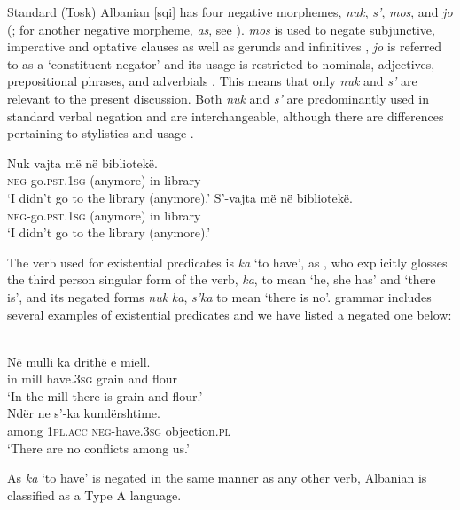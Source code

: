 \documentclass[output=paper,colorlinks,citecolor=brown]{langscibook}
\begin{document}
Standard (Tosk) Albanian [sqi] has four negative morphemes,
\textit{nuk}, \textit{s’}, \textit{mos}, and \textit{jo}
(\citealt[82]{Turano2000}; for another negative morpheme, \textit{as}, see
\citealt[172]{BuchholzFiedler1987}). \textit{mos} is used to negate
subjunctive, imperative and optative clauses as well as gerunds and
infinitives \citep[85]{Turano2000}, \textit{jo} is referred to as a
`constituent negator' and its usage is restricted to nominals, adjectives,
prepositional phrases, and adverbials \citep[86]{Turano2000}. This means
that only \textit{nuk} and \textit{s’} are relevant to the present
discussion. Both \textit{nuk} and \textit{s’} are predominantly used in
standard verbal negation and are interchangeable, although there are
differences pertaining to stylistics and usage \parencite[172]{BuchholzFiedler1987}. 
%
\begin{exe}\ex
{}
\begin{xlist}
\ex
    \gll Nuk vajta {\op}më{\cp} në bibliotekë.  \\
\textsc{neg}  go.\textsc{pst.1sg} (anymore) in  library \\
    \glt `I didn't go to the library (anymore).' 
\ex
\gll S’-vajta {\op}më{\cp} në bibliotekë.\\
\textsc{neg}-go.\textsc{pst}.\textsc{1sg}  (anymore) in library\\
\glt `I didn't go to the library (anymore).' 
\end{xlist}\end{exe}
%
The verb used for existential predicates is \textit{ka} `to have', as \citet[12]{Camaj1984}, who explicitly glosses the third person singular form of the verb, \textit{ka}, to mean `he, she has' and `there is', and its negated forms \textit{nuk} \textit{ka}, \textit{s’ka} to mean `there is no'.  grammar includes several examples of existential predicates and we have listed a negated one below:
%
\begin{exe}\ex
{}\\
    \gll Në  mulli ka drithë e miell. \\
in mill have.\textsc{3sg} grain and flour \\
    \glt
`In the mill there is grain and flour.' 
\ex
{}\\
    \gll Ndër ne s’-ka kundërshtime. \\
among \textsc{1pl}.\textsc{acc}  \textsc{neg}-have.\textsc{3sg} objection.\textsc{pl} \\
    \glt `There are no conflicts among us.' 
    \end{exe}
%
As \textit{ka} `to have' is negated in the same manner as any other verb,
Albanian is classified as a Type A language. 
\end{document}
